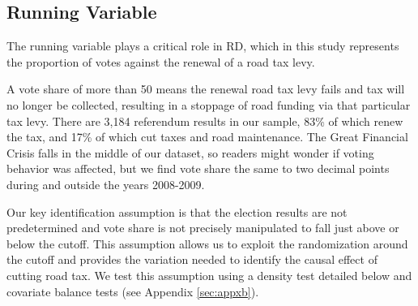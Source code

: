 









\subsection{Running Variable}

The running variable plays a critical role in RD, which in this study represents the proportion of votes against the renewal of a road tax levy. 

A vote share of more than 50 means the renewal road tax levy fails and tax will no longer be collected, resulting in a stoppage of road funding via that particular tax levy. There are 3,184 referendum results in our sample, 83\% of which renew the tax, and 17\% of which cut taxes and road maintenance. The Great Financial Crisis falls in the middle of our dataset, so readers might wonder if voting behavior was affected, but we find vote share the same to two decimal points during and outside the years 2008-2009. 

Our key identification assumption is that the election results are not predetermined and vote share is not precisely manipulated to fall just above or below the cutoff. This assumption allows us to exploit the randomization around the cutoff and provides the variation needed to identify the causal effect of cutting road tax. We test this assumption using a density test detailed below and covariate balance tests (see Appendix \ref{sec:appxb}).

